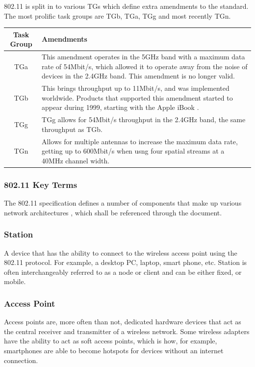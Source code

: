 802.11 is split in to various TGs which define extra amendments to the standard. The most prolific task groups are TGb, TGa, TGg and most recently TGn.

\begin{table}[htb!]
\begin{center}
	\begin{tabular}{| c | p{ 10cm } |}
		\hline
		\textbf{Task Group} & \textbf{Amendments} \\ \hline
		TGa & This amendment operates in the 5GHz band with a maximum data rate of 54Mbit/s, which allowed it to operate away from the noise of devices in the 2.4GHz band. This amendment is no longer valid. \\ \hline
		TGb & This brings throughput up to 11Mbit/s, and was implemented worldwide. Products that supported this amendment started to appear during 1999, starting with the Apple iBook \cite{intro:apple_ibook}. \\ \hline
		TGg & TGg allows for 54Mbit/s throughput in the 2.4GHz band, the same throughput as TGb. \\ \hline
		TGn & Allows for multiple antennas to increase the maximum data rate, getting up to 600Mbit/s when usng four spatial streams at a 40MHz channel width. \\ 
		\hline
	\end{tabular}
\end{center}
\end{table}
\clearpage
\subsubsection{802.11 Key Terms}

The 802.11 specification defines a number of components that make up various network architectures \cite{intro:80211_lecture}, which shall be referenced through the document.

\subsubsection*{Station}
A device that has the ability to connect to the wireless access point using the 802.11 protocol. For example, a desktop PC, laptop, smart phone, etc. Station is often interchangeably referred to as a node or client and can be either fixed, or mobile.

\subsubsection*{Access Point}
Access points are, more often than not, dedicated hardware devices that act as the central receiver and transmitter of a wireless network. Some wireless adapters have the ability to act as soft access points, which is how, for example, smartphones are able to become hotspots for devices without an internet connection.

